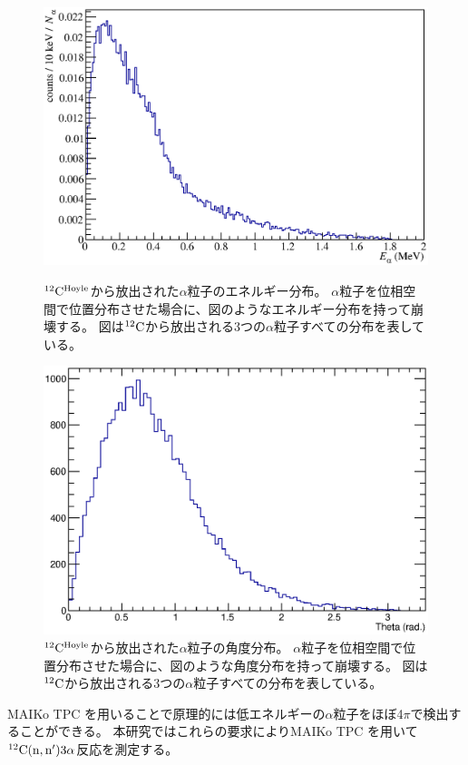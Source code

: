 \begin{figure}
  \centering
  \includegraphics[clip, width=0.7\columnwidth]{eps/alpha_e_dist_sim.eps}
  \caption[${}^{12}{\rm C}^{\rm Hoyle}$から放出された$\alpha$粒子のエネルギー分布。]
          {${}^{12}{\rm C}^{\rm Hoyle}$から放出された$\alpha$粒子のエネルギー分布。
          $\alpha$粒子を位相空間で位置分布させた場合に、図のようなエネルギー分布を持って崩壊する。
            図は${}^{12}{\rm C}$から放出される3つの$\alpha$粒子すべての分布を表している。}
  \label{fig::alpha_E_dist}
  \includegraphics[clip, width=0.7\columnwidth]{eps/alpha_theta_dist.eps}
  \caption[${}^{12}{\rm C}^{\rm Hoyle}$から放出された$\alpha$粒子の角度分布。]
          {${}^{12}{\rm C}^{\rm Hoyle}$から放出された$\alpha$粒子の角度分布。
            $\alpha$粒子を位相空間で位置分布させた場合に、図のような角度分布を持って崩壊する。
            図は${}^{12}{\rm C}$から放出される3つの$\alpha$粒子すべての分布を表している。
          }
  \label{fig::alpha_theta_dist}
\end{figure}
MAIKo TPC を用いることで原理的には低エネルギーの$\alpha$粒子をほぼ4$\pi$で検出することができる。
本研究ではこれらの要求によりMAIKo TPC を用いて${}^{12}{\rm C}({\rm n},{\rm n}')3\alpha$反応を測定する。


